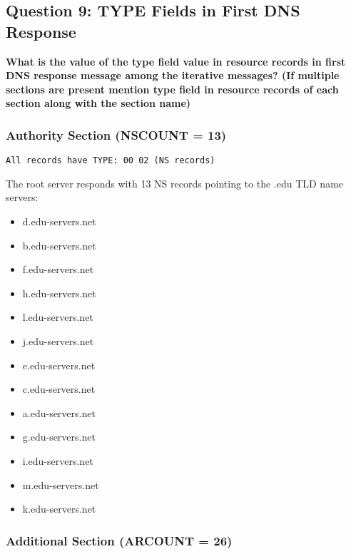 \documentclass[11pt,letterpaper]{article}
\begin{document}
\newpage

\subsection{Question 9: TYPE Fields in First DNS Response}

\textbf{What is the value of the type field value in resource records in first DNS response message among the iterative messages? (If multiple sections are present mention type field in resource records of each section along with the section name)}

\subsubsection{Authority Section (NSCOUNT = 13)}

\begin{hexbox}
\begin{lstlisting}[style=hexstyle]
All records have TYPE: 00 02 (NS records)
\end{lstlisting}
\end{hexbox}

The root server responds with 13 NS records pointing to the .edu TLD name servers:
\begin{multicols}{2}
\begin{itemize}
    \item d.edu-servers.net
    \item b.edu-servers.net
    \item f.edu-servers.net
    \item h.edu-servers.net
    \item l.edu-servers.net
    \item j.edu-servers.net
    \item e.edu-servers.net
    \item c.edu-servers.net
    \item a.edu-servers.net
    \item g.edu-servers.net
    \item i.edu-servers.net
    \item m.edu-servers.net
    \item k.edu-servers.net
\end{itemize}
\end{multicols}

\subsubsection{Additional Section (ARCOUNT = 26)}
\end{document}

